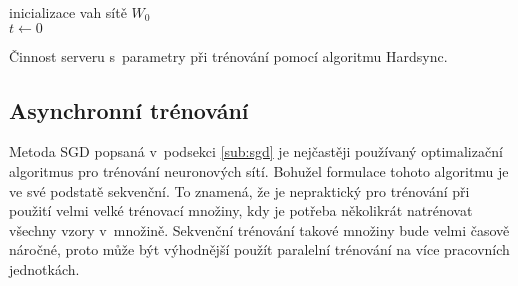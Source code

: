 \begin{algorithm}
    \SetAlgoLined
    inicializace vah sítě $W_0$\\
    $t \leftarrow 0$\\
\caption{Činnost serveru s~parametry při trénování pomocí algoritmu Hardsync.}
\label{alg:sync_server}
\end{algorithm}

\subsection{Asynchronní trénování}
\label{sub:async}

Metoda SGD popsaná v~podsekci \ref{sub:sgd} je nejčastěji používaný optimalizační algoritmus pro trénování neuronových sítí.
Bohužel formulace tohoto algoritmu je ve své podstatě sekvenční.
To znamená, že je nepraktický pro trénování při použití velmi velké trénovací množiny, kdy je potřeba několikrát natrénovat všechny vzory v~množině.
Sekvenční trénování takové množiny bude velmi časově náročné, proto může být výhodnější použít paralelní trénování na více pracovních jednotkách.

